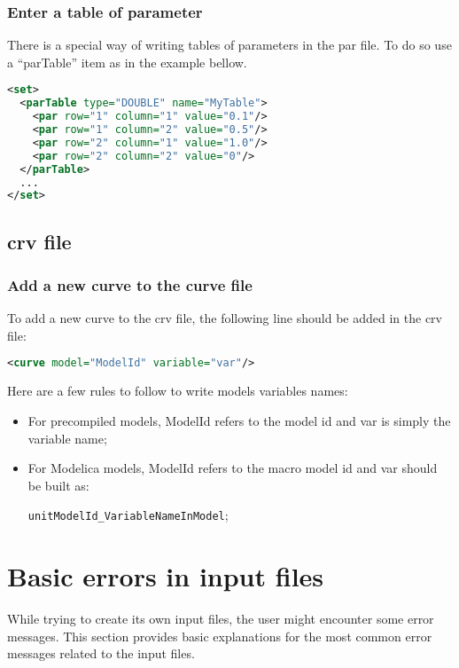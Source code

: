 \documentclass[a4paper, 12pt]{report}
\begin{document}
\subsubsection{Enter a table of parameter}

There is a special way of writing tables of parameters in the par file. To do so use a ``parTable'' item as in the example bellow.
\begin{lstlisting}[language=XML, morekeywords={parTable}]
<set>
  <parTable type="DOUBLE" name="MyTable">
    <par row="1" column="1" value="0.1"/>
    <par row="1" column="2" value="0.5"/>
    <par row="2" column="1" value="1.0"/>
    <par row="2" column="2" value="0"/>
  </parTable>
  ...
</set>
\end{lstlisting}

\subsection{crv file}

\subsubsection{Add a new curve to the curve file}

To add a new curve to the crv file, the following line should be added in the crv file:
\begin{lstlisting}[language=XML,numbers=none]
<curve model="ModelId" variable="var"/>
\end{lstlisting}

Here are a few rules to follow to write models variables names:
\begin{itemize}
\item For precompiled models, ModelId refers to the model id and var is simply the variable name;
\item For Modelica models, ModelId refers to the macro model id and var should be built as:

\verb|unitModelId_VariableNameInModel|;
\end{itemize}

\section{Basic errors in input files}

While trying to create its own input files, the user might encounter some error messages. This section provides basic explanations for the most common error messages related to the input files. \\
\end{document}
